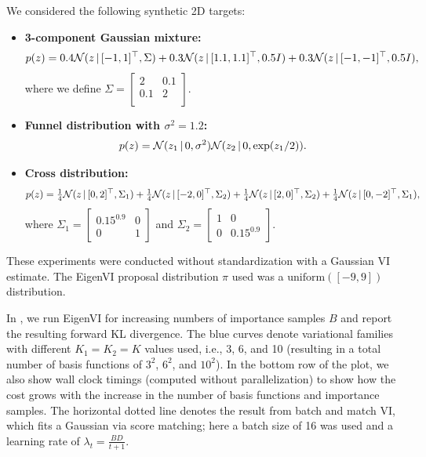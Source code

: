 We considered the following synthetic 2D targets:

\begin{itemize}

    \item \textbf{3-component Gaussian mixture:}
    \begin{align*}
    p(z) =
    0.4 \mathcal{N}(z \,|\, [-1,1]^\top,\Sigma)
    +
    0.3 \mathcal{N}(z \,|\,  [1.1,1.1]^\top,0.5I)
    +
    0.3 \mathcal{N}(z \,|\, [-1,-1]^\top,0.5I),
\end{align*}
where we define
$\Sigma =
\begin{bmatrix}
    2 & 0.1 \\
    0.1 & 2 \\
\end{bmatrix}$.


\item \textbf{Funnel distribution with $\sigma^2=1.2$:}
\begin{align*}
    p(z) = \mathcal{N}(z_1 \,|\, 0, \sigma^2) \mathcal{N}(z_2 \,|\, 0, \exp(z_1/2)).
\end{align*}

\item \textbf{ Cross distribution:}
\begin{align*}
    p(z) =
    \tfrac{1}{4} \mathcal{N}(z \,|\, [0,2]^\top,\Sigma_1)
    +
     \tfrac{1}{4} \mathcal{N}(z \,|\, [-2,0]^\top,\Sigma_2)
    +
     \tfrac{1}{4} \mathcal{N}(z \,|\,  [2,0]^\top,\Sigma_2)
    +
     \tfrac{1}{4} \mathcal{N}(z \,|\,  [0,-2]^\top,\Sigma_1),
\end{align*}
where
$\Sigma_1 = \begin{bmatrix}
0.15^{0.9} & 0 \\ 0 & 1
\end{bmatrix}$
and
$\Sigma_2 = \begin{bmatrix}
    1 & 0 \\
0 & 0.15^{0.9}
\end{bmatrix}$.

\end{itemize}

These experiments were conducted without standardization with a Gaussian VI estimate.
The EigenVI proposal distribution $\pi$ used was a $\text{uniform}([-9,9])$ distribution.

In  , we run EigenVI for increasing numbers of importance samples $B$
and report the resulting forward KL divergence.
The blue curves denote variational families with different $K_1=K_2=K$ values used,
i.e., 3, 6, and 10 (resulting in a total
number of basis functions of $3^2$, $6^2$, and $10^2$).
In the bottom row of the plot, we also show wall clock timings (computed without parallelization)
to show how the cost grows with the increase in the number of basis functions and importance samples.
The horizontal dotted line denotes the result from batch and match VI,
which fits a Gaussian via score matching; here a batch size of 16 was used
and a learning rate of $\lambda_t = \tfrac{BD}{t+1}$.


